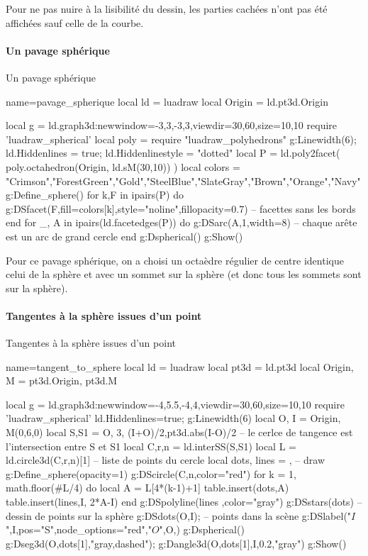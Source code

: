 Pour ne pas nuire à la lisibilité du dessin, les parties cachées n'ont pas été affichées sauf celle de la courbe.

\paragraph{Un pavage sphérique}

\begin{demo}{Un pavage sphérique}
\begin{luadraw}{name=pavage_spherique}
local ld = luadraw
local Origin = ld.pt3d.Origin

local g = ld.graph3d:new{window={-3,3,-3,3},viewdir={30,60},size={10,10}}
require 'luadraw_spherical'
local poly = require "luadraw_polyhedrons"
g:Linewidth(6); ld.Hiddenlines = true; ld.Hiddenlinestyle = "dotted"
local P = ld.poly2facet( poly.octahedron(Origin, ld.sM(30,10)) )
local colors = {"Crimson","ForestGreen","Gold","SteelBlue","SlateGray","Brown","Orange","Navy"}
g:Define_sphere()
for k,F in ipairs(P) do
    g:DSfacet(F,{fill=colors[k],style="noline",fillopacity=0.7})  -- facettes sans les bords
end
for _, A in ipairs(ld.facetedges(P)) do
    g:DSarc(A,1,{width=8}) -- chaque arête est un arc de grand cercle
end
g:Dspherical()
g:Show()
\end{luadraw}
\end{demo}

Pour ce pavage sphérique, on a choisi un octaèdre régulier de centre identique celui de la sphère et avec un sommet sur la sphère (et donc tous les sommets sont sur la sphère).

\paragraph{Tangentes à la sphère issues d'un point}

\begin{demo}{Tangentes à la sphère issues d'un point}
\begin{luadraw}{name=tangent_to_sphere}
local ld = luadraw
local pt3d = ld.pt3d
local Origin, M = pt3d.Origin, pt3d.M

local g = ld.graph3d:new{window={-4,5.5,-4,4},viewdir={30,60},size={10,10}}
require 'luadraw_spherical'
ld.Hiddenlines=true; g:Linewidth(6)
local O, I = Origin, M(0,6,0)
local S,S1 = {O, 3}, {(I+O)/2,pt3d.abs(I-O)/2}
-- le cerlce de tangence est l'intersection entre S et S1
local C,r,n = ld.interSS(S,S1) 
local L = ld.circle3d(C,r,n)[1] -- liste de points du cercle
local dots, lines = {}, {}
-- draw
g:Define_sphere({opacity=1})
g:DScircle({C,n},{color="red"})
for k = 1, math.floor(#L/4) do
    local A = L[4*(k-1)+1]
    table.insert(dots,A)
    table.insert(lines,{I, 2*A-I})
end
g:DSpolyline(lines ,{color="gray"})
g:DSstars(dots) -- dessin de points sur la sphère
g:DSdots({O,I});  -- points dans la scène
g:DSlabel("$I$",I,{pos="S",node_options="red"},"$O$",O,{})
g:Dspherical()
g:Dseg3d({O,dots[1]},"gray,dashed"); g:Dangle3d(O,dots[1],I,0.2,"gray")
g:Show() 
\end{luadraw}
\end{demo}

